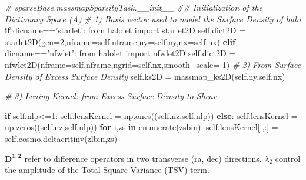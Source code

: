 \documentclass[11pt]{article}
\newenvironment{Shaded}{}{}
\newcommand{\KeywordTok}[1]{\textcolor[rgb]{0.00,0.44,0.13}{\textbf{{#1}}}}
\newcommand{\DecValTok}[1]{\textcolor[rgb]{0.25,0.63,0.44}{{#1}}}
\newcommand{\StringTok}[1]{\textcolor[rgb]{0.25,0.44,0.63}{{#1}}}
\newcommand{\CommentTok}[1]{\textcolor[rgb]{0.38,0.63,0.69}{\textit{{#1}}}}
\newcommand{\NormalTok}[1]{{#1}}
\newcommand{\ImportTok}[1]{{#1}}
\newcommand{\VariableTok}[1]{\textcolor[rgb]{0.10,0.09,0.49}{{#1}}}
\newcommand{\ControlFlowTok}[1]{\textcolor[rgb]{0.00,0.44,0.13}{\textbf{{#1}}}}
\newcommand{\OperatorTok}[1]{\textcolor[rgb]{0.40,0.40,0.40}{{#1}}}
\newcommand{\BuiltInTok}[1]{{#1}}
\begin{document}
\begin{Shaded}
\begin{Highlighting}[]
\CommentTok{# sparseBase.massmapSparsityTask.__init__}
\CommentTok{## Initialization of the Dictionary Space (A)}
\CommentTok{# 1) Basis vector used to model the Surface Density of halo  }
\ControlFlowTok{if}\NormalTok{ dicname}\OperatorTok{==}\StringTok{'starlet'}\NormalTok{:}
    \ImportTok{from}\NormalTok{ halolet }\ImportTok{import}\NormalTok{ starlet2D}
    \VariableTok{self}\NormalTok{.dict2D }\OperatorTok{=}\NormalTok{   starlet2D(gen}\OperatorTok{=}\DecValTok{2}\NormalTok{,nframe}\OperatorTok{=}\VariableTok{self}\NormalTok{.nframe,ny}\OperatorTok{=}\VariableTok{self}\NormalTok{.ny,nx}\OperatorTok{=}\VariableTok{self}\NormalTok{.nx)}
\ControlFlowTok{elif}\NormalTok{ dicname}\OperatorTok{==}\StringTok{'nfwlet'}\NormalTok{:}
    \ImportTok{from}\NormalTok{ halolet }\ImportTok{import}\NormalTok{ nfwlet2D}
    \VariableTok{self}\NormalTok{.dict2D }\OperatorTok{=}\NormalTok{   nfwlet2D(nframe}\OperatorTok{=}\VariableTok{self}\NormalTok{.nframe,ngrid}\OperatorTok{=}\VariableTok{self}\NormalTok{.nx,smooth_scale}\OperatorTok{=-}\DecValTok{1}\NormalTok{)}
\CommentTok{# 2) From Surface Density of Excess Surface Density}
\VariableTok{self}\NormalTok{.ks2D   }\OperatorTok{=}\NormalTok{   massmap_ks2D(}\VariableTok{self}\NormalTok{.ny,}\VariableTok{self}\NormalTok{.nx)}

\CommentTok{# 3) Lening Kernel: from Excess Surface Density to Shear}

\ControlFlowTok{if} \VariableTok{self}\NormalTok{.nlp}\OperatorTok{<=}\DecValTok{1}\NormalTok{:}
    \VariableTok{self}\NormalTok{.lensKernel }\OperatorTok{=}\NormalTok{   np.ones((}\VariableTok{self}\NormalTok{.nz,}\VariableTok{self}\NormalTok{.nlp))}
\ControlFlowTok{else}\NormalTok{:}
    \VariableTok{self}\NormalTok{.lensKernel }\OperatorTok{=}\NormalTok{   np.zeros((}\VariableTok{self}\NormalTok{.nz,}\VariableTok{self}\NormalTok{.nlp))}
    \ControlFlowTok{for}\NormalTok{ i,zs }\KeywordTok{in} \BuiltInTok{enumerate}\NormalTok{(zsbin):}
        \VariableTok{self}\NormalTok{.lensKernel[i,:]    }\OperatorTok{=}   \VariableTok{self}\NormalTok{.cosmo.deltacritinv(zlbin,zs)}
\end{Highlighting}
\end{Shaded}

    \(\mathbf{D^{1,2}}\) refer to difference operators in two transverse
(ra, dec) directions. \(\lambda_2\) control the amplitude of the Total
Square Variance (TSV) term.
\end{document}
